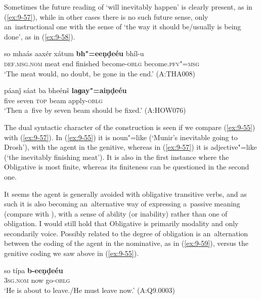 Sometimes the future reading of `will inevitably happen' is clearly present, as in (\ref{ex:9-57}), while in other cases there is no such future sense, only an~instructional one with the sense of `the way it should be/usually is being done', as in (\ref{ex:9-58}).

\begin{exe}
\ex
\label{ex:9-57}
\gll so mhaás aaxér xátum \textbf{bh"=eeṇḍeéu} bhíl-u \\
\textsc{def.msg.nom} meat end finished become-\textsc{oblg} become.\textsc{pfv"=msg}  \\
\glt `The meat would, no doubt, be gone in the end.' (A:THA008)

\ex
\label{ex:9-58}
\gll páanǰ sáat ba bheénš \textbf{laɡay"=aiṇḍeéu} \\
five seven \textsc{top} beam apply-\textsc{oblg} \\
\glt `Then a~five by seven beam should be fixed.' (A:HOW076)
\end{exe}

The dual syntactic character of the construction is seen if we compare (\ref{ex:9-55}) with (\ref{ex:9-57}). In (\ref{ex:9-55}) it is noun"=like (`Munir's inevitable going to Drosh'), with the agent in the genitive, whereas in (\ref{ex:9-57}) it is adjective"=like (`the inevitably finishing meat'). It is also in the first instance where the Obligative is most finite, whereas its finiteness can be questioned in the second one.


It seems the agent is generally avoided with obligative transitive verbs, and as such it is also becoming an~alternative way of expressing a~passive meaning (compare with ), with a sense of ability (or inability) rather than one of obligation. I would still hold that Obligative is primarily modality and only secondarily voice. Possibly related to the degree of obligation is an~alternation between the coding of the agent in the nominative, as in (\ref{ex:9-59}), versus the genitive coding we saw above in (\ref{ex:9-55}).

\begin{exe}
\ex
\label{ex:9-59}
\gll so típa \textbf{b-eeṇḍeéu} \\
\textsc{3sg.nom} now go-\textsc{oblg} \\
\glt `He is about to leave./He must leave now.' (A:Q9.0003)
\end{exe}

